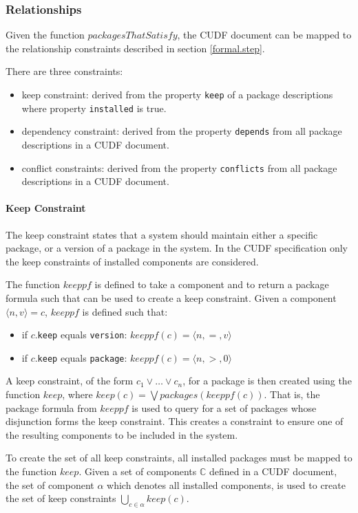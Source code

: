 \subsubsection{Relationships}
Given the function $packagesThatSatisfy$, the CUDF document can be mapped to the relationship constraints described in section \ref{formal.step}.

There are three constraints:
\begin{itemize}
  \item keep constraint: derived from the property \verb+keep+ of a package descriptions where property \verb+installed+ is true.
  \item dependency constraint: derived from the property \verb+depends+ from all package descriptions in a CUDF document.
  \item conflict constraints: derived from the property \verb+conflicts+ from all package descriptions in a CUDF document.
\end{itemize}

\paragraph{Keep Constraint}
The keep constraint states that a system should maintain either a specific package, or a version of a package in the system.
In the CUDF specification only the keep constraints of installed components are considered.

The function $keeppf$ is defined to take a component and to return a package formula such that can be used to create a keep constraint.
Given a component $\langle n,v \rangle = c$, $keeppf$ is defined such that:
\begin{itemize}
	\item if $c$.\verb+keep+ equals \verb+version+: $keeppf(c) = \langle n, =, v \rangle$
	\item if $c$.\verb+keep+ equals \verb+package+: $keeppf(c) = \langle n, >, 0 \rangle$
\end{itemize}

A keep constraint, of the form $c_1 \vee \ldots \vee c_n$, for a package is then created using the function $keep$,
where $keep(c) = \bigvee packages(keeppf(c))$.
That is, the package formula from $keeppf$ is used to query for a set of packages whose disjunction forms the keep constraint.
This creates a constraint to ensure one of the resulting components to be included in the system.

To create the set of all keep constraints, all installed packages must be mapped to the function $keep$.
Given a set of components $\mathbb{C}$ defined in a CUDF document, 
the set of component $\alpha$ which denotes all installed components, is used to create the set of keep constraints $\bigcup \limits_{c \in \alpha} keep(c)$.

